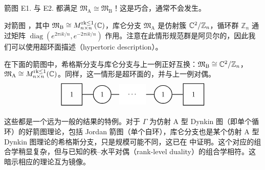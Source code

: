 \begin{ex}
箭图 E1. 与 E2. 都满足 $\mathfrak{M}_{\operatorname{A}}\cong \mathfrak{M}_{\operatorname{B}}$！这是巧合，通常不会发生。
\end{ex}
\begin{ex}
    对箭图 ，其中 $\mathfrak{M}_{\operatorname{B}}\cong M_{n\times n}^{\mathrm{rk}\leq 1}(\mathbb{C})$，库仑分支 $\mathfrak{M}_{\operatorname{A}}$ 是仿射簇 $\mathbb{C}^2/\mathbb{Z}_{n}$，循环群 $\mathbb{Z}_{n}$ 通过矩阵 $\operatorname{diag}(e^{2\pi ik/n},e^{-2\pi ik/n})$ 作用。注意在此情形规范群是阿贝尔的，因此我们可以使用超环面描述（hypertoric description）。
\end{ex}
\begin{ex} 在下面的箭图中，希格斯分支与库仑分支与上一例正好互换：$\mathfrak{M}_{\operatorname{B}}\cong \mathbb{C}^2/\mathbb{Z}_{n}$，$ \mathfrak{M}_{\operatorname{A}}\cong M_{n\times n}^{\mathrm{rk}\leq 1}(\mathbb{C})$。同样，这一情形是超环面的，并与上一例对偶。
\begin{equation*}
\tikz{
	\node[draw, thick,inner sep=12pt]  (a) at (-4.5,0) {$1$};
	\node[draw, thick, circle, inner sep=6pt,fill=white] (b) at (-3,0) {$1$};	
		\node[draw, thick, circle, inner sep=6pt,fill=white] (d) at (0,0) {$1$};
	\node[draw, thick,inner sep=12pt] (s) at (1.5,0){$1$};
	\node[inner sep=12pt,fill=white] (c) at (-1.5,0){$\cdots$};
		\draw[thick] (a) -- (b) ;
		\draw[thick] (b) -- (c) ;
		\draw[thick] (c) -- (d) ;
		\draw[thick] (d) -- (s) ;
}
\end{equation*}
\end{ex}

这些都是一个远为一般的结果的特例。对于 $\Gamma$ 为仿射 A 型 Dynkin 图（即单个循环）的好箭图理论，包括 Jordan 箭图（单个自环），库仑分支也是某个仿射 A 型 Dynkin 图理论的希格斯分支，只是规模可能不同，这已在 \cite{nakajimaCherkisBow2017} 中证明。这个对应的组合学稍显复杂，但与已知的秩--水平对偶（rank-level duality）的组合学相符。这暗示相应的理论互为镜像。

